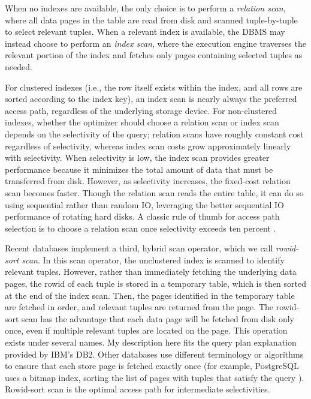When no indexes are available, the only choice is to perform a \emph{relation scan}, where all data pages in the table are read from disk and scanned tuple-by-tuple to select relevant tuples.
When a relevant index is available, the DBMS may instead choose to perform an \emph{index scan}, where the execution engine traverses the relevant portion of the index and fetches only pages containing selected tuples as needed.

For clustered indexes (i.e., the row itself exists within the index, and all rows are sorted according to the index key), an index scan is nearly always the preferred access path, regardless of the underlying storage device.  
For non-clustered indexes, whether the optimizer should choose a relation scan or index scan depends on the selectivity of the query; relation scans have roughly constant cost regardless of selectivity, whereas index scan costs grow approximately linearly with selectivity.
When selectivity is low, the index scan provides greater performance because it minimizes the total amount of data that must be transferred from disk.
However, as selectivity increases, the fixed-cost relation scan becomes faster.  
Though the relation scan reads the entire table, it can do so using sequential rather than random IO, leveraging the better sequential IO performance of rotating hard disks.
A classic rule of thumb for access path selection is to choose a relation scan once selectivity exceeds ten percent \cite{RamakrishnanAndGehrke}.

Recent databases implement a third, hybrid scan operator, which we call \emph{rowid-sort scan}.
In this scan operator, the unclustered index is scanned to identify relevant tuples.
However, rather than immediately fetching the underlying data pages, the rowid of each tuple is stored in a temporary table, which is then sorted at the end of the index scan.
Then, the pages identified in the temporary table are fetched in order, and relevant tuples are returned from the page.
The rowid-sort scan has the advantage that each data page will be fetched from disk only once, even if multiple relevant tuples are located on the page. 
This operation exists under several names.
My description here fits the query plan explanation provided by IBM's DB2.
Other databases use different terminology or algorithms to ensure that each store page is fetched exactly once (for example, PostgreSQL uses a bitmap index, sorting the list of pages with tuples that satisfy the query \cite{PostgresLossyBitMap}).
Rowid-sort scan is the optimal access path for intermediate selectivities.

